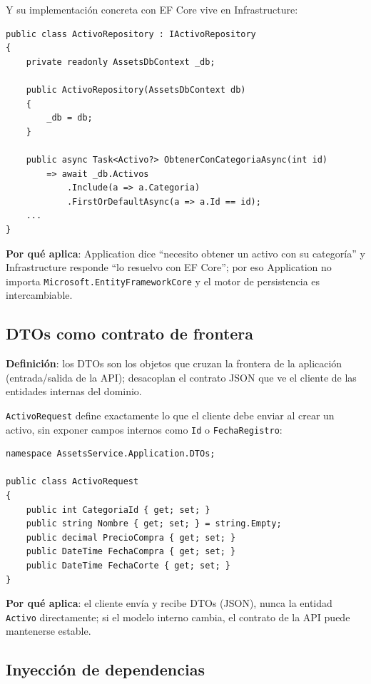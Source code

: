 \documentclass[11pt,a4paper]{article}
\begin{document}
Y su implementación concreta con EF Core vive en Infrastructure:

\begin{lstlisting}[style=csharp, caption={AssetsService.Infrastructure/Persistence/ActivoRepository.cs}]
public class ActivoRepository : IActivoRepository
{
    private readonly AssetsDbContext _db;

    public ActivoRepository(AssetsDbContext db)
    {
        _db = db;
    }

    public async Task<Activo?> ObtenerConCategoriaAsync(int id)
        => await _db.Activos
            .Include(a => a.Categoria)
            .FirstOrDefaultAsync(a => a.Id == id);
    ...
}
\end{lstlisting}

\textbf{Por qué aplica}: Application dice ``necesito obtener un activo con su
categoría'' y Infrastructure responde ``lo resuelvo con EF Core''; por eso
Application no importa \texttt{Microsoft.EntityFrameworkCore} y el motor de
persistencia es intercambiable.

\subsection{DTOs como contrato de frontera}

\textbf{Definición}: los DTOs son los objetos que cruzan la frontera de la
aplicación (entrada/salida de la API); desacoplan el contrato JSON que ve el
cliente de las entidades internas del dominio.

\texttt{ActivoRequest} define exactamente lo que el cliente debe enviar al
crear un activo, sin exponer campos internos como \texttt{Id} o
\texttt{FechaRegistro}:

\begin{lstlisting}[style=csharp, caption={AssetsService.Application/DTOs/ActivoRequest.cs}]
namespace AssetsService.Application.DTOs;

public class ActivoRequest
{
    public int CategoriaId { get; set; }
    public string Nombre { get; set; } = string.Empty;
    public decimal PrecioCompra { get; set; }
    public DateTime FechaCompra { get; set; }
    public DateTime FechaCorte { get; set; }
}
\end{lstlisting}

\textbf{Por qué aplica}: el cliente envía y recibe DTOs (JSON), nunca la
entidad \texttt{Activo} directamente; si el modelo interno cambia, el contrato
de la API puede mantenerse estable.

\subsection{Inyección de dependencias}
\end{document}
